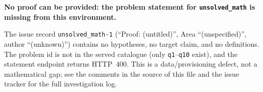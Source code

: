 \documentclass[12pt]{article}
\begin{document}
\noindent\textbf{No proof can be provided: the problem statement for
\texttt{unsolved\_math} is missing from this environment.}

\medskip
\noindent The issue record \texttt{unsolved\_math-1} (``Proof: (untitled)'',
Area ``(unspecified)'', author ``(unknown)'') contains no hypotheses, no target
claim, and no definitions. The problem id is not in the served catalogue
(only \texttt{q1}--\texttt{q10} exist), and the statement endpoint returns
HTTP~400. This is a data/provisioning defect, not a mathematical gap; see the
comments in the source of this file and the issue tracker for the full
investigation log.
\end{document}
